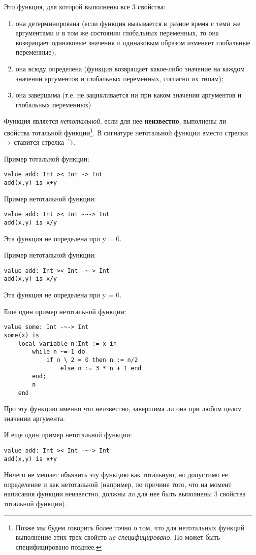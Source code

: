 Это функция, для которой выполнены все 3 свойства:
\begin{enumerate}
  \item она детерминирована (если функция вызывается в разное время с теми же аргументами и в том же состоянии глобальных переменных, то она возвращает одинаковые значения и одинаковым образом изменяет глобальные переменные);
  \item она всюду определена (функция возвращает какое-либо значение на каждом значении аргументов и глобальных переменных, согласно их типам);
  \item она завершима (т.е. не зацикливается ни при каком значении аргументов и глобальных переменных)
\end{enumerate}
Функция является \emph{нетотальной}, если для нее \textbf{неизвестно}, выполнены ли свойства тотальной функции\footnote{Позже мы будем говорить более точно о том, что для нетотальных функций выполнение этих трех свойств \emph{не специфицировано}. Но может быть специфицировано позднее.}. В сигнатуре нетотальной функции вместо стрелки $\rightarrow$ ставится стрелка $\widetilde{\rightarrow}$.

Пример тотальной функции:
\begin{lstlisting}
value add: Int >< Int -> Int
add(x,y) is x+y
\end{lstlisting}

Пример нетотальной функции:
\begin{lstlisting}
value add: Int >< Int -~-> Int
add(x,y) is x/y
\end{lstlisting}
Эта функция не определена при y = 0.

Пример нетотальной функции:
\begin{lstlisting}
value add: Int >< Int -~-> Int
add(x,y) is x/y
\end{lstlisting}
Эта функция не определена при y = 0.

Еще один пример нетотальной функции:
\begin{lstlisting}
value some: Int -~-> Int
some(x) is
    local variable n:Int := x in
        while n ~= 1 do
            if n \ 2 = 0 then n := n/2
                else n := 3 * n + 1 end
        end;
        n
    end
\end{lstlisting}
Про эту функцию именно что неизвестно, завершима ли она при любом целом значении аргумента.

И еще один пример нетотальной функции:
\begin{lstlisting}
value add: Int >< Int -~-> Int
add(x,y) is x+y
\end{lstlisting}
Ничего не мешает объявить эту функцию как тотальную, но допустимо ее определение и как нетотальной (например, по причине того, что на момент написания функции неизвестно, должны ли для нее быть выполнены 3 свойства тотальной функции).

